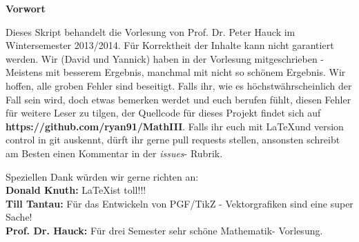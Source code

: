 \begin{LARGE}
\textbf{Vorwort}
\end{LARGE}

Dieses Skript behandelt die Vorlesung  von Prof. Dr. Peter
Hauck im Wintersemester 2013/2014. Für Korrektheit der Inhalte kann nicht
garantiert werden. Wir (David und Yannick) haben in der Vorlesung
mitgeschrieben - Meistens mit besserem Ergebnis, manchmal mit nicht so schönem
Ergebnis. Wir hoffen, alle groben Fehler sind beseitigt. Falls ihr, wie es
höchstwährscheinlich der Fall sein wird, doch etwas bemerken werdet und euch
berufen fühlt, diesen Fehler für weitere Leser zu tilgen, der Quellcode für
dieses Projekt findet sich auf \textbf{https://github.com/ryan91/MathIII}.
Falls ihr euch mit \LaTeX und version control in git auskennt, dürft ihr gerne
pull requests stellen, ansonsten schreibt am Besten einen Kommentar in der
\textit{issues}- Rubrik.

Speziellen Dank würden wir gerne richten an:\\
\textbf{Donald Knuth:} \LaTeX ist toll!!!\\
\textbf{Till Tantau:} Für das Entwickeln von PGF/TikZ - Vektorgrafiken sind
eine super Sache!\\
\textbf{Prof. Dr. Hauck:} Für drei Semester sehr schöne Mathematik- Vorlesung.
